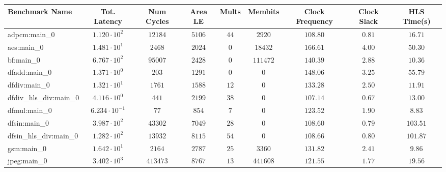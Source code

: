 \begin{tabular}{|l|c|c|c|c|c|c|c|c|}
\hline
Benchmark Name          & Tot. Latency            & Num Cycles & Area LE   & Mults   & Membits    & Clock Frequency & Clock Slack & HLS Time(s) \\
\hline
adpcm:main\_0           & $ 1.120 \cdot 10^{2}  $ & $ 12184  $ & $ 5106  $ & $ 44  $ & $ 2920   $ & $ 108.80      $ & $ 0.81    $ & $ 16.71   $ \\
aes:main\_0             & $ 1.481 \cdot 10^{1}  $ & $ 2468   $ & $ 2024  $ & $ 0   $ & $ 18432  $ & $ 166.61      $ & $ 4.00    $ & $ 50.30   $ \\
bf:main\_0              & $ 6.767 \cdot 10^{2}  $ & $ 95007  $ & $ 2428  $ & $ 0   $ & $ 111472 $ & $ 140.39      $ & $ 2.88    $ & $ 10.36   $ \\
dfadd:main\_0           & $ 1.371 \cdot 10^{0}  $ & $ 203    $ & $ 1291  $ & $ 0   $ & $ 0      $ & $ 148.06      $ & $ 3.25    $ & $ 55.79   $ \\
dfdiv:main\_0           & $ 1.321 \cdot 10^{1}  $ & $ 1761   $ & $ 1588  $ & $ 12  $ & $ 0      $ & $ 133.28      $ & $ 2.50    $ & $ 11.91   $ \\
dfdiv\_hls\_div:main\_0 & $ 4.116 \cdot 10^{0}  $ & $ 441    $ & $ 2199  $ & $ 38  $ & $ 0      $ & $ 107.14      $ & $ 0.67    $ & $ 13.00   $ \\
dfmul:main\_0           & $ 6.234 \cdot 10^{-1} $ & $ 77     $ & $ 854   $ & $ 7   $ & $ 0      $ & $ 123.52      $ & $ 1.90    $ & $ 8.83    $ \\
dfsin:main\_0           & $ 3.987 \cdot 10^{2}  $ & $ 43302  $ & $ 7049  $ & $ 28  $ & $ 0      $ & $ 108.60      $ & $ 0.79    $ & $ 103.51  $ \\
dfsin\_hls\_div:main\_0 & $ 1.282 \cdot 10^{2}  $ & $ 13932  $ & $ 8115  $ & $ 54  $ & $ 0      $ & $ 108.66      $ & $ 0.80    $ & $ 101.87  $ \\
gsm:main\_0             & $ 1.642 \cdot 10^{1}  $ & $ 2164   $ & $ 2787  $ & $ 25  $ & $ 3360   $ & $ 131.82      $ & $ 2.41    $ & $ 9.86    $ \\
jpeg:main\_0            & $ 3.402 \cdot 10^{3}  $ & $ 413473 $ & $ 8767  $ & $ 13  $ & $ 441608 $ & $ 121.55      $ & $ 1.77    $ & $ 19.56   $ \\

\end{tabular}
